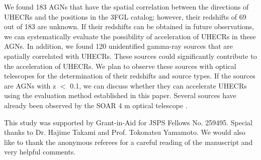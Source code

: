 \documentclass{aastex6}
\newcommand\aastex{AAS\TeX}
\begin{document}
\indent We found 183 AGNs that have the spatial correlation between the directions of UHECRs and the positions in the 3FGL catalog; however,  their redshifts of 69 out of 183 are unknown.
If their redshifts can be obtained in future observations, we can systematically evaluate the possibility of acceleration of UHECRs in these AGNs.
In addition, we found 120 unidentified gamma-ray sources that are spatially correlated with UHECRs.
These sources could significantly contribute to the acceleration of UHECRs. 
We plan to observe these sources with optical telescopes for the determination of their redshifts and source types.
If the sources are AGNs with z $<$ 0.1, we can discuss whether they can accelerate UHECRs using the evaluation method established in this paper.
Several sources have already been observed by the SOAR 4 m optical telescope \citep{SOAR}.




\acknowledgments
This study was supported by Grant-in-Aid for JSPS Fellows No. 259495. 
Special thanks to Dr. Hajime Takami and Prof. Tokonatsu Yamamoto.
We would also like to thank the anonymous referees for a careful reading of
the manuscript and very helpful comments.
\end{document}
